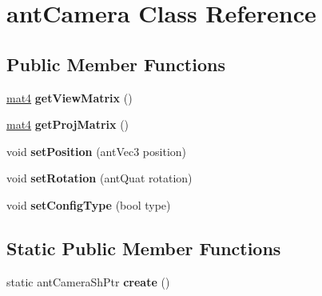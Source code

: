 \hypertarget{classant_camera}{\section{ant\+Camera Class Reference}
\label{classant_camera}
}
\subsection*{Public Member Functions}
\begin{DoxyCompactItemize}
\item 
\hypertarget{classant_camera_afc306c4adfde275b49c735ae68ee857e}{\hyperlink{structmat4}{mat4} {\bfseries get\+View\+Matrix} ()}\label{classant_camera_afc306c4adfde275b49c735ae68ee857e}

\item 
\hypertarget{classant_camera_a91398d63af3a186225ecb1d788b4b6d4}{\hyperlink{structmat4}{mat4} {\bfseries get\+Proj\+Matrix} ()}\label{classant_camera_a91398d63af3a186225ecb1d788b4b6d4}

\item 
\hypertarget{classant_camera_a02249b4eec2ba04abd37fe9ca24ddae5}{void {\bfseries set\+Position} (ant\+Vec3 position)}\label{classant_camera_a02249b4eec2ba04abd37fe9ca24ddae5}

\item 
\hypertarget{classant_camera_a2d05ef34b8057eaefd6a684d57cacbaa}{void {\bfseries set\+Rotation} (ant\+Quat rotation)}\label{classant_camera_a2d05ef34b8057eaefd6a684d57cacbaa}

\item 
\hypertarget{classant_camera_a155acb0975f1716f7e2d098799f59f6f}{void {\bfseries set\+Config\+Type} (bool type)}\label{classant_camera_a155acb0975f1716f7e2d098799f59f6f}

\end{DoxyCompactItemize}
\subsection*{Static Public Member Functions}
\begin{DoxyCompactItemize}
\item 
\hypertarget{classant_camera_ae545dc3467f359f7161f196cc84bf192}{static ant\+Camera\+Sh\+Ptr {\bfseries create} ()}\label{classant_camera_ae545dc3467f359f7161f196cc84bf192}

\end{DoxyCompactItemize}
